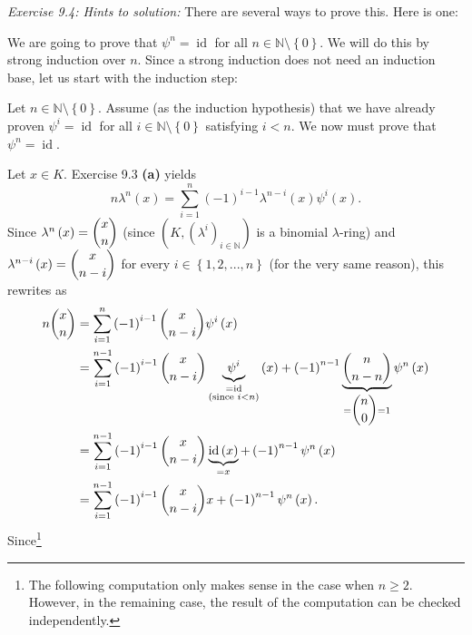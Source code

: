\documentclass[numbers=enddot,12pt,final,onecolumn,notitlepage]{scrartcl}%
\begin{document}
\textit{Exercise 9.4: Hints to solution:} There are several ways to prove
this. Here is one:

We are going to prove that $\psi^{n}=\operatorname*{id}$ for all
$n\in\mathbb{N}\setminus\left\{  0\right\}  $. We will do this by strong
induction over $n$. Since a strong induction does not need an induction base,
let us start with the induction step:

Let $n\in\mathbb{N}\setminus\left\{  0\right\}  $. Assume (as the induction
hypothesis) that we have already proven $\psi^{i}=\operatorname*{id}$ for all
$i\in\mathbb{N}\setminus\left\{  0\right\}  $ satisfying $i<n$. We now must
prove that $\psi^{n}=\operatorname*{id}$.

Let $x\in K$. Exercise 9.3 \textbf{(a)} yields%
\[
n\lambda^{n}\left(  x\right)  =\sum_{i=1}^{n}\left(  -1\right)  ^{i-1}%
\lambda^{n-i}\left(  x\right)  \psi^{i}\left(  x\right)  .
\]
Since $\lambda^{n}\left(  x\right)  =\dbinom{x}{n}$ (since $\left(  K,\left(
\lambda^{i}\right)  _{i\in\mathbb{N}}\right)  $ is a binomial $\lambda$-ring)
and $\lambda^{n-i}\left(  x\right)  =\dbinom{x}{n-i}$ for every $i\in\left\{
1,2,...,n\right\}  $ (for the very same reason), this rewrites as%
\begin{align*}
n\dbinom{x}{n}  &  =\sum_{i=1}^{n}\left(  -1\right)  ^{i-1}\dbinom{x}{n-i}%
\psi^{i}\left(  x\right) \\
&  =\sum_{i=1}^{n-1}\left(  -1\right)  ^{i-1}\dbinom{x}{n-i}\underbrace{\psi
^{i}}_{\substack{=\operatorname*{id}\\\text{(since }i<n\text{)}}}\left(
x\right)  +\left(  -1\right)  ^{n-1}\underbrace{\dbinom{n}{n-n}}_{=\dbinom
{n}{0}=1}\psi^{n}\left(  x\right) \\
&  =\sum_{i=1}^{n-1}\left(  -1\right)  ^{i-1}\dbinom{x}{n-i}%
\underbrace{\operatorname*{id}\left(  x\right)  }_{=x}+\left(  -1\right)
^{n-1}\psi^{n}\left(  x\right) \\
&  =\sum_{i=1}^{n-1}\left(  -1\right)  ^{i-1}\dbinom{x}{n-i}x+\left(
-1\right)  ^{n-1}\psi^{n}\left(  x\right)  .
\end{align*}
Since\footnote{The following computation only makes sense in the case when
$n\geq2$. However, in the remaining case, the result of the computation can be
checked independently.}%
\end{document}
